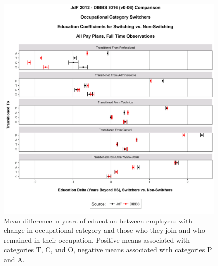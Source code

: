 \documentclass[10pt, letterpaper]{article}
\begin{document}
\begin{spacing}{1.0}
\begin{figure}[h]
    \centering
    \includegraphics[width=6.5in, trim={0 0 0 1.5in}, clip]{OccCatTransitionVsNonTransAllPayPlansEd.png}
    \caption{Mean difference in years of education between employees with change in occupational category and those who they join and who remained in their occupation.  Positive means associated with categories T, C, and O, negative means associated with categories P and A.}
    \label{figure:OccCatTransitionVsNonTransAllPayPlansEd}
\end{figure}

\clearpage


\end{spacing}

\newpage

\begingroup
\begin{spacing}{1.0}
    \raggedright
    
\end{spacing}
\endgroup
\end{document}
